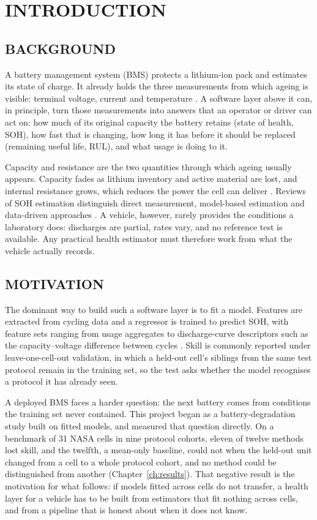 \chapter{INTRODUCTION}

\section{BACKGROUND}

A battery management system (BMS) protects a lithium-ion pack and estimates its state of charge. It already holds the three measurements from which ageing is visible: terminal voltage, current and temperature \cite{waag2014}. A software layer above it can, in principle, turn those measurements into answers that an operator or driver can act on: how much of its original capacity the battery retains (state of health, SOH), how fast that is changing, how long it has before it should be replaced (remaining useful life, RUL), and what usage is doing to it.

Capacity and resistance are the two quantities through which ageing usually appears. Capacity fades as lithium inventory and active material are lost, and internal resistance grows, which reduces the power the cell can deliver \cite{vetter2005,barre2013}. Reviews of SOH estimation distinguish direct measurement, model-based estimation and data-driven approaches \cite{berecibar2016,waag2014}. A vehicle, however, rarely provides the conditions a laboratory does: discharges are partial, rates vary, and no reference test is available. Any practical health estimator must therefore work from what the vehicle actually records.

\section{MOTIVATION}

The dominant way to build such a software layer is to fit a model. Features are extracted from cycling data and a regressor is trained to predict SOH, with feature sets ranging from usage aggregates to discharge-curve descriptors such as the capacity--voltage difference between cycles \cite{severson2019}. Skill is commonly reported under leave-one-cell-out validation, in which a held-out cell's siblings from the same test protocol remain in the training set, so the test asks whether the model recognises a protocol it has already seen.

A deployed BMS faces a harder question: the next battery comes from conditions the training set never contained. This project began as a battery-degradation study built on fitted models, and measured that question directly. On a benchmark of 31 NASA cells in nine protocol cohorts, eleven of twelve methods lost skill, and the twelfth, a mean-only baseline, could not when the held-out unit changed from a cell to a whole protocol cohort, and no method could be distinguished from another (Chapter~\ref{ch:results}). That negative result is the motivation for what follows: if models fitted across cells do not transfer, a health layer for a vehicle has to be built from estimators that fit nothing across cells, and from a pipeline that is honest about when it does not know.

